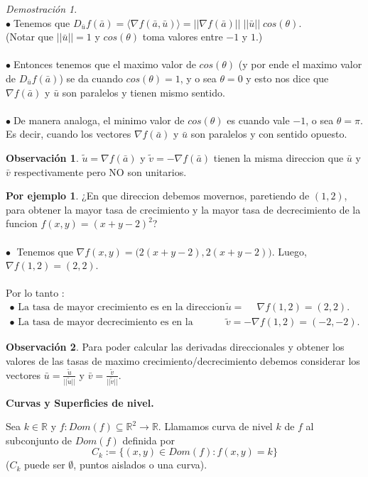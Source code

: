 \documentclass{article}
\theoremstyle{definition}
\newtheorem*{obs}{Observación}
\newtheorem*{ej}{Por ejemplo}
\theoremstyle{remark}
\newtheorem*{demo}{Demostración}
\newcommand\bl{$\bullet\;$}
\begin{document}
\begin{demo}
  \; \\
  \bl Tenemos que $D_{\bar{u}}f(\bar{a})=\big\langle \nabla f(\bar{a},\bar{u})\big\rangle = || \nabla f(\bar{a})||\; ||\bar{u}|| \; cos(\theta)$. \\ \big(Notar que $||\bar{u}||=1$ y $cos(\theta)$ toma valores entre $-1$ y $1$.\big)\\\\ \bl Entonces tenemos que el maximo valor de $cos(\theta)$ \big(y por ende el maximo valor de $D_{\bar{u}}f(\bar{a})$\big) se da cuando $cos(\theta)=1$, y o sea $\theta=0$ y esto nos dice que $\nabla f(\bar{a})$ y $\bar{u}$ son paralelos y tienen mismo sentido. \\\\
  \bl De manera analoga, el minimo valor de $cos(\theta)$ es cuando vale $-1$, o sea $\theta=\pi$. Es decir, cuando los vectores $\nabla f(\bar{a})$ y $\bar{u}$ son paralelos y con sentido opuesto.
\end{demo}
\begin{obs}
  $\tilde{u}=\nabla f(\bar{a})$ y $\tilde{v}=-\nabla f(\bar{a})$ tienen la misma direccion que $\bar{u}$ y $\bar{v}$ respectivamente pero NO son unitarios.
\end{obs}
\pagebreak
\begin{ej}
  ¿En que direccion debemos movernos, paretiendo de $(1,2)$, para obtener la mayor tasa de crecimiento y la mayor tasa de decrecimiento de la funcion $f(x,y)=(x+y-2)^2$? \\\\
  \textcolor{rojop2}{\bl} Tenemos que $\nabla f(x,y)=\big(2(x+y-2),2(x+y-2)\big).$ Luego, $\nabla f(1,2)=(2,2)$. \\\\
  Por lo tanto : \[
    \begin{array}{ll}
    \bullet \text{ La tasa de mayor crecimiento es en la direccion }& \tilde{u}=\phantom{-}\nabla f(1,2)=(2,2). \\
    \bullet \text{ La tasa de mayor decrecimiento es en la direccion} & \tilde{v}=-\nabla f(1,2)=(-2,-2).
  \end{array}
  \]
\end{ej}
\begin{obs}
  Para poder calcular las derivadas direccionales y obtener los valores de las tasas de maximo crecimiento/decrecimiento debemos considerar los vectores $\bar{u}=\frac{\tilde{u}}{||\tilde{u}||}$ y $\bar{v}=\frac{\tilde{v}}{||\tilde{v}||}$.
\end{obs}\pagebreak
\begin{center}
\textbf{Curvas y Superficies de nivel.}
\end{center}
\begin{defi}
  Sea $k \in \mathbb{R}$ y $f : Dom(f) \subseteq \mathbb{R}^2 \to \mathbb{R}$. Llamamos curva de nivel $k$ de $f$ al subconjunto de $Dom(f)$ definida por \[
    C_k:=\big\{(x,y) \in Dom(f) : f(x,y) = k\big\}
  \]
  \big($C_k$ puede ser $\emptyset$, puntos aislados o una curva\big).
\end{defi}
\end{document}
